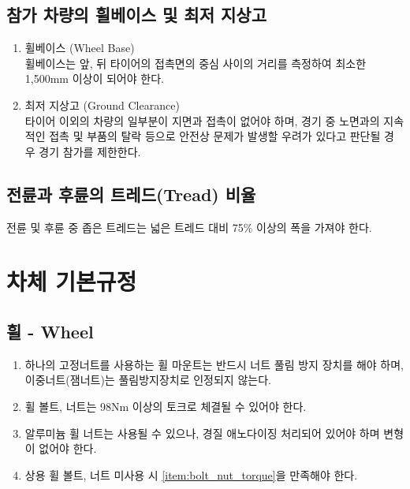 \documentclass[a4paper,10pt]{report}
\begin{document}
\section{참가 차량의 휠베이스 및 최저 지상고}

\begin{enumerate}
  \item 휠베이스 (Wheel Base)\\
    휠베이스는 앞, 뒤 타이어의 접촉면의 중심 사이의 거리를 측정하여 최소한 1,500mm 이상이 되어야 한다.
  \item 최저 지상고 (Ground Clearance)\\
    타이어 이외의 차량의 일부분이 지면과 접촉이 없어야 하며, 경기 중 노면과의 지속적인 접촉 및 부품의 탈락 등으로 안전상 문제가 발생할 우려가 있다고 판단될 경우 경기 참가를 제한한다.
\end{enumerate}

\section{전륜과 후륜의 트레드(Tread) 비율}

전륜 및 후륜 중 좁은 트레드는 넓은 트레드 대비 75\% 이상의 폭을 가져야 한다.

\chapter{차체 기본규정}

\section{휠 - Wheel}
\begin{enumerate}
  \item 하나의 고정너트를 사용하는 휠 마운트는 반드시 너트 풀림 방지 장치를 해야 하며, 이중너트(잼너트)는 풀림방지장치로 인정되지 않는다.
  \item \label{item:bolt_nut_torque} 휠 볼트, 너트는 98Nm 이상의 토크로 체결될 수 있어야 한다.
  \item 알루미늄 휠 너트는 사용될 수 있으나, 경질 애노다이징 처리되어 있어야 하며 변형이 없어야 한다.
  \item 상용 휠 볼트, 너트 미사용 시 \hyperref[item:bolt_nut_torque]{\ref{item:bolt_nut_torque}}을 만족해야 한다.
\end{enumerate}

\end{document}
